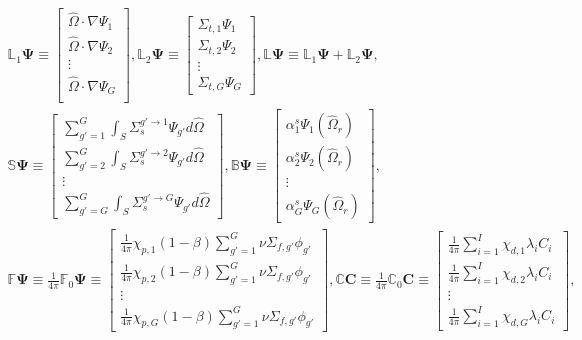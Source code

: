 \begin{gather}
  \mathbb{L}_1\bm{\Psi} \equiv
  \begin{bmatrix}
    \hat{\Omega}\cdot\nabla\Psi_1 \\
    \hat{\Omega}\cdot\nabla\Psi_2 \\
    \vdots \\
    \hat{\Omega}\cdot\nabla\Psi_G \\
  \end{bmatrix},
  \mathbb{L}_2\bm{\Psi} \equiv
  \begin{bmatrix}
    \Sigma_{t,1}\Psi_1 \\
    \Sigma_{t,2}\Psi_2 \\
    \vdots \\
    \Sigma_{t,G}\Psi_G
  \end{bmatrix},
  \mathbb{L}\bm{\Psi} \equiv \mathbb{L}_1\bm{\Psi} + \mathbb{L}_2\bm{\Psi}, \nonumber \\
  \mathbb{S}\bm{\Psi} \equiv
  \begin{bmatrix}
    \sum^G_{g'=1}\int_S \Sigma_s^{g'\rightarrow 1}\Psi_{g'}d\hat{\Omega} \\
    \sum^G_{g'=2}\int_S \Sigma_s^{g'\rightarrow 2}\Psi_{g'}d\hat{\Omega} \\
    \vdots \\
    \sum^G_{g'=G}\int_S \Sigma_s^{g'\rightarrow G}\Psi_{g'}d\hat{\Omega}
  \end{bmatrix},
  \mathbb{B}\bm{\Psi} \equiv
  \begin{bmatrix}
    \alpha^s_1\Psi_1(\hat{\Omega}_r) \\
    \alpha^s_2\Psi_2(\hat{\Omega}_r) \\
    \vdots \\
    \alpha^s_G\Psi_G(\hat{\Omega}_r)
  \end{bmatrix}, \nonumber \\
  \mathbb{F}\bm{\Psi} \equiv \frac{1}{4\pi}\mathbb{F}_0\bm{\Psi} \equiv
  \begin{bmatrix}
    \frac{1}{4\pi}\chi_{p,1}(1-\beta)\sum^G_{g'=1}\nu\Sigma_{f,g'}\phi_{g'} \\
    \frac{1}{4\pi}\chi_{p,2}(1-\beta)\sum^G_{g'=1}\nu\Sigma_{f,g'}\phi_{g'} \\
    \vdots \\
    \frac{1}{4\pi}\chi_{p,G}(1-\beta)\sum^G_{g'=1}\nu\Sigma_{f,g'}\phi_{g'}
  \end{bmatrix},
  \mathbb{C}\bm{C} \equiv \frac{1}{4\pi}\mathbb{C}_0\bm{C} \equiv
  \begin{bmatrix}
    \frac{1}{4\pi}\sum^I_{i=1}\chi_{d,1} \lambda_i C_i \\
    \frac{1}{4\pi}\sum^I_{i=1}\chi_{d,2} \lambda_i C_i \\
    \vdots \\
    \frac{1}{4\pi}\sum^I_{i=1}\chi_{d,G} \lambda_i C_i
  \end{bmatrix}, \nonumber
\end{gather}

